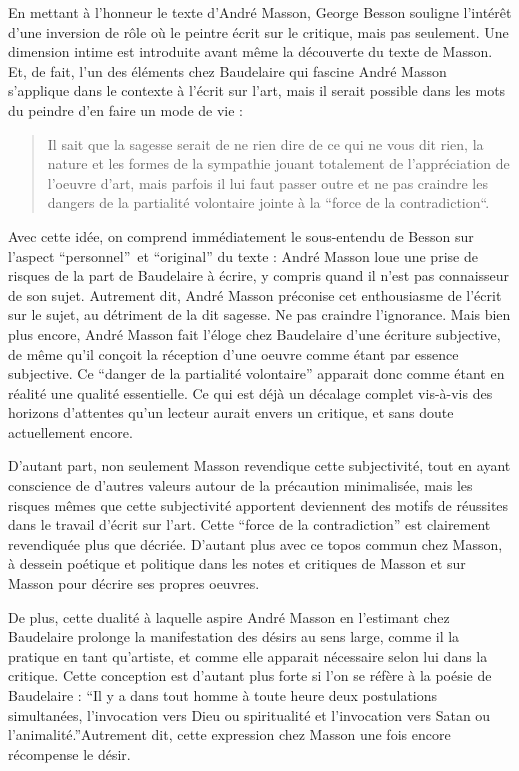 	En mettant à l’honneur le texte d’André Masson, George Besson souligne l’intérêt d’une inversion de rôle où le peintre écrit sur le critique, mais pas seulement. Une dimension intime est introduite avant même la découverte du texte de Masson. Et, de fait, l’un des éléments chez Baudelaire qui fascine André Masson s’applique dans le contexte à l’écrit sur l’art, mais il serait possible dans les mots du peindre d’en faire un mode de vie : 
\begin{quote}
Il sait que la sagesse serait de ne rien dire de ce qui ne vous dit rien, la nature et les formes de la sympathie jouant totalement de l’appréciation de l’oeuvre d’art, mais parfois il lui faut passer outre et ne pas craindre les dangers de la partialité volontaire jointe à la “force de la contradiction“. 	
\end{quote}

Avec cette idée, on comprend immédiatement le sous-entendu de Besson sur l’aspect \enquote{personnel} et \enquote{original} du texte : André Masson loue une prise de risques de la part de Baudelaire à écrire, y compris quand il n’est pas connaisseur de son sujet. Autrement dit, André Masson préconise cet enthousiasme de l’écrit sur le sujet, au détriment de la dit sagesse. Ne pas craindre l’ignorance. Mais bien plus encore, André Masson fait l’éloge chez Baudelaire d’une écriture subjective, de même qu’il conçoit la réception d’une oeuvre comme étant par essence subjective. Ce \enquote{danger de la partialité volontaire} apparait donc comme étant en réalité une qualité essentielle. Ce qui est déjà un décalage complet vis-à-vis des horizons d’attentes qu’un lecteur aurait envers un critique, et sans doute actuellement encore. 

	D’autant part, non seulement Masson revendique cette subjectivité, tout en ayant conscience de d’autres valeurs autour de la précaution minimalisée, mais les risques mêmes que cette subjectivité apportent deviennent des motifs de réussites dans le travail d’écrit sur l’art. Cette \enquote{force de la contradiction} est clairement revendiquée plus que décriée. D’autant plus avec ce topos commun chez Masson, à dessein poétique et politique dans les notes et critiques de Masson et sur Masson pour décrire ses propres oeuvres. 

	De plus, cette dualité à laquelle aspire André Masson en l’estimant chez Baudelaire prolonge la manifestation des désirs au sens large, comme il la pratique en tant qu’artiste, et comme elle apparait nécessaire selon lui dans la critique. Cette conception est d’autant plus forte si l’on se réfère à la poésie de Baudelaire : \enquote{Il y a dans tout homme à toute heure deux postulations simultanées, l’invocation vers Dieu ou spiritualité et l’invocation vers Satan ou l’animalité.}Autrement dit, cette expression chez Masson une fois encore récompense le désir. 

